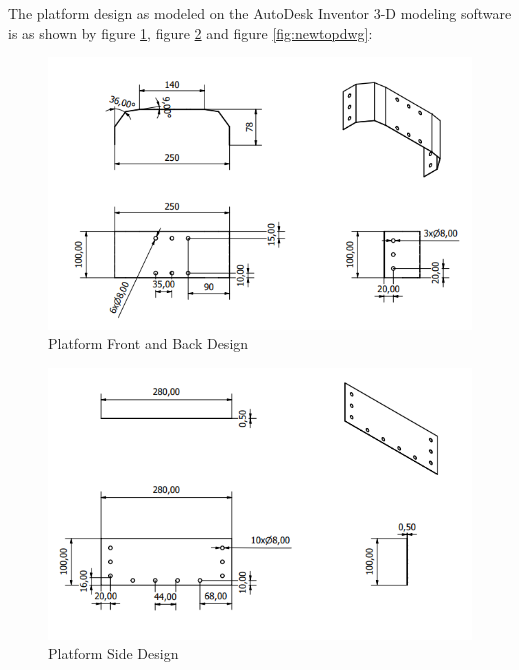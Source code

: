 The platform design as modeled on the AutoDesk Inventor 3-D modeling software is as shown by figure \ref{fig:newfrontdwg}, figure \ref{fig:newsidedwg} and figure \ref{fig:newtopdwg}:

\begin{figure}[H]
    \centering
    \includegraphics[scale = 0.9]{Figures/NewFrontDWG.png}
    \caption{Platform Front and Back Design}
    \label{fig:newfrontdwg}
\end{figure}

\begin{figure}[H]
    \centering
    \includegraphics[scale = 0.9]{Figures/NewSideDWG.png}
    \caption{Platform Side Design}
    \label{fig:newsidedwg}
\end{figure}

